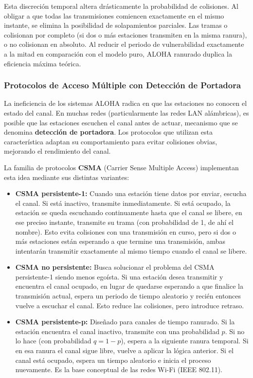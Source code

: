 \begin{itemize}
    Esta discreción temporal altera drásticamente la probabilidad de colisiones. Al obligar a que todas las transmisiones comiencen exactamente en el mismo instante, se elimina la posibilidad de solapamientos parciales. Las tramas o colisionan por completo (si dos o más estaciones transmiten en la misma ranura), o no colisionan en absoluto. Al reducir el periodo de vulnerabilidad exactamente a la mitad en comparación con el modelo puro, ALOHA ranurado duplica la eficiencia máxima teórica.
\end{itemize}


\subsubsection{Protocolos de Acceso Múltiple con Detección de Portadora}

La ineficiencia de los sistemas ALOHA radica en que las estaciones no conocen el estado del canal. En muchas redes (particularmente las redes LAN alámbricas), es posible que las estaciones escuchen el canal antes de actuar, mecanismo que se denomina \textbf{detección de portadora}. Los protocolos que utilizan esta característica adaptan su comportamiento para evitar colisiones obvias, mejorando el rendimiento del canal. 

La familia de protocolos \textbf{CSMA} (Carrier Sense Multiple Access) implementan esta idea mediante sus distintas variantes:

\begin{itemize}
    \item \textbf{CSMA persistente-1:} Cuando una estación tiene datos por enviar, escucha el canal. Si está inactivo, transmite inmediatamente. Si está ocupado, la estación se queda escuchando continuamente hasta que el canal se libere, en ese preciso instante, transmite su trama (con probabilidad de 1, de ahí el nombre). Esto evita colisiones con una transmisión en curso, pero si dos o más estaciones están esperando a que termine una transmisión, ambas intentarán transmitir exactamente al mismo tiempo cuando el canal se libere.

    \item \textbf{CSMA no persistente:} Busca solucionar el problema del CSMA persistente-1 siendo menos egoísta. Si una estación desea transmitir y encuentra el canal ocupado, en lugar de quedarse esperando a que finalice la transmisión actual, espera un periodo de tiempo aleatorio y recién entonces vuelve a escuchar el canal. Esto reduce las colisiones, pero introduce retraso.

    \item \textbf{CSMA persistente-p:} Diseñado para canales de tiempo ranurado. Si la estación encuentra el canal inactivo, transmite con una probabilidad $p$. Si no lo hace (con probabilidad $q = 1-p$), espera a la siguiente ranura temporal. Si en esa ranura el canal sigue libre, vuelve a aplicar la lógica anterior. Si el canal está ocupado, espera un tiempo aleatorio e inicia el proceso nuevamente. Es la base conceptual de las redes Wi-Fi (IEEE 802.11).
\end{itemize}

